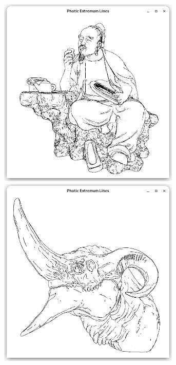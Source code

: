 \documentclass[9pt,fleqn,twoside,twocolumn]{stdglobal}
\begin{document}
\begin{figure}
\begin{subfigure}[t]{0.19\textwidth}
        \includegraphics[width=0.95\textwidth,trim={15px 15 15 50},clip]{images/results/luyu-contours-pel.png}
        \includegraphics[width=0.95\textwidth,trim={15px 15 15 50},clip]{images/results/dragon-head-contours-pel.png}

\end{subfigure}
\end{figure}
\end{document}
